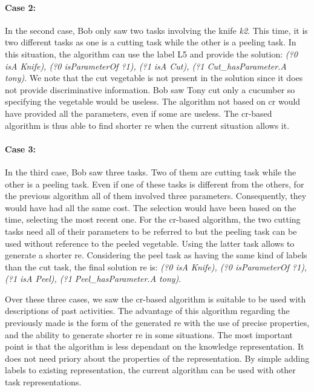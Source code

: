 \paragraph{Case 2:} In the second case, Bob only saw two tasks involving the knife \textit{k2}. This time, it is two different tasks as one is a cutting task while the other is a peeling task. In this situation, the algorithm can use the label L5 and provide the solution: \textit{(?0 isA Knife), (?0 isParameterOf ?1), (?1 isA Cut), (?1 Cut\_hasParameter.A tony)}. We note that the cut vegetable is not present in the solution since it does not provide discriminative information. Bob saw Tony cut only a cucumber so specifying the vegetable would be useless. The algorithm not based on \acrshort{cr} would have provided all the parameters, even if some are useless. The \acrshort{cr}-based algorithm is thus able to find shorter \acrshort{re} when the current situation allows it.

\paragraph{Case 3:} In the third case, Bob saw three tasks. Two of them are cutting task while the other is a peeling task. Even if one of these tasks is different from the others, for the previous algorithm all of them involved three parameters. Consequently, they would have had all the same cost. The selection would have been based on the time, selecting the most recent one. For the \acrshort{cr}-based algorithm, the two cutting tasks need all of their parameters to be referred to but the peeling task can be used without reference to the peeled vegetable. Using the latter task allows to generate a shorter \acrshort{re}. Considering the peel task as having the same kind of labels than the cut task, the final solution \acrshort{re} is: \textit{(?0 isA Knife), (?0 isParameterOf ?1), (?1 isA Peel), (?1 Peel\_hasParameter.A tony)}.

Over these three cases, we saw the \acrshort{cr}-based algorithm is suitable to be used with descriptions of past activities. The advantage of this algorithm regarding the previously made is the form of the generated \acrshort{re} with the use of precise properties, and the ability to generate shorter \acrshort{re} in some situations. The most important point is that the algorithm is less dependant on the knowledge representation. It does not need priory about the properties of the representation. By simple adding labels to existing representation, the current algorithm can be used with other task representations.

